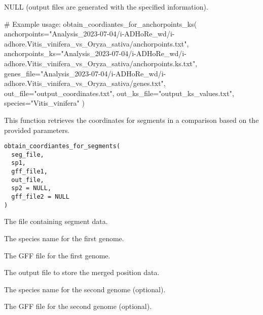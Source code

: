 \documentclass[a4paper]{book}
\begin{document}
%
\begin{Value}
NULL (output files are generated with the specified information).
\end{Value}
%
\begin{Examples}
\begin{ExampleCode}
# Example usage:
obtain_coordiantes_for_anchorpoints_ks(
    anchorpoints="Analysis_2023-07-04/i-ADHoRe_wd/i-adhore.Vitis_vinifera_vs_Oryza_sativa/anchorpoints.txt",
    anchorpoints_ks="Analysis_2023-07-04/i-ADHoRe_wd/i-adhore.Vitis_vinifera_vs_Oryza_sativa/anchorpoints.ks.txt",
    genes_file="Analysis_2023-07-04/i-ADHoRe_wd/i-adhore.Vitis_vinifera_vs_Oryza_sativa/genes.txt",
    out_file="output_coordinates.txt",
    out_ks_file="output_ks_values.txt",
    species="Vitis_vinifera"
)
\end{ExampleCode}
\end{Examples}
%
\begin{Description}\relax
This function retrieves the coordinates for segments in a comparison based on the provided parameters.
\end{Description}
%
\begin{Usage}
\begin{verbatim}
obtain_coordiantes_for_segments(
  seg_file,
  sp1,
  gff_file1,
  out_file,
  sp2 = NULL,
  gff_file2 = NULL
)
\end{verbatim}
\end{Usage}
%
\begin{Arguments}
\begin{ldescription}
\item[\code{seg\_file}] The file containing segment data.

\item[\code{sp1}] The species name for the first genome.

\item[\code{gff\_file1}] The GFF file for the first genome.

\item[\code{out\_file}] The output file to store the merged position data.

\item[\code{sp2}] The species name for the second genome (optional).

\item[\code{gff\_file2}] The GFF file for the second genome (optional).
\end{ldescription}
\end{Arguments}
\end{document}
